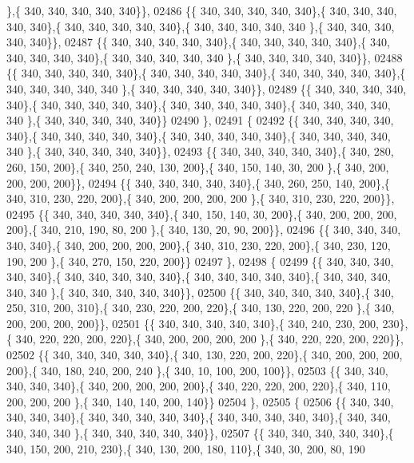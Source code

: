 \begin{DoxyCode}
      \},\{ 340, 340, 340, 340, 340\}\},
02486 \{\{ 340, 340, 340, 340, 340\},\{ 340, 340, 340, 340, 340\},\{ 340, 340, 340, 340, 340\},\{ 340, 340, 340, 340, 340
      \},\{ 340, 340, 340, 340, 340\}\},
02487 \{\{ 340, 340, 340, 340, 340\},\{ 340, 340, 340, 340, 340\},\{ 340, 340, 340, 340, 340\},\{ 340, 340, 340, 340, 340
      \},\{ 340, 340, 340, 340, 340\}\},
02488 \{\{ 340, 340, 340, 340, 340\},\{ 340, 340, 340, 340, 340\},\{ 340, 340, 340, 340, 340\},\{ 340, 340, 340, 340, 340
      \},\{ 340, 340, 340, 340, 340\}\},
02489 \{\{ 340, 340, 340, 340, 340\},\{ 340, 340, 340, 340, 340\},\{ 340, 340, 340, 340, 340\},\{ 340, 340, 340, 340, 340
      \},\{ 340, 340, 340, 340, 340\}\}
02490 \},
02491 \{
02492 \{\{ 340, 340, 340, 340, 340\},\{ 340, 340, 340, 340, 340\},\{ 340, 340, 340, 340, 340\},\{ 340, 340, 340, 340, 340
      \},\{ 340, 340, 340, 340, 340\}\},
02493 \{\{ 340, 340, 340, 340, 340\},\{ 340, 280, 260, 150, 200\},\{ 340, 250, 240, 130, 200\},\{ 340, 150, 140,  30, 200
      \},\{ 340, 200, 200, 200, 200\}\},
02494 \{\{ 340, 340, 340, 340, 340\},\{ 340, 260, 250, 140, 200\},\{ 340, 310, 230, 220, 200\},\{ 340, 200, 200, 200, 200
      \},\{ 340, 310, 230, 220, 200\}\},
02495 \{\{ 340, 340, 340, 340, 340\},\{ 340, 150, 140,  30, 200\},\{ 340, 200, 200, 200, 200\},\{ 340, 210, 190,  80, 200
      \},\{ 340, 130,  20,  90, 200\}\},
02496 \{\{ 340, 340, 340, 340, 340\},\{ 340, 200, 200, 200, 200\},\{ 340, 310, 230, 220, 200\},\{ 340, 230, 120, 190, 200
      \},\{ 340, 270, 150, 220, 200\}\}
02497 \},
02498 \{
02499 \{\{ 340, 340, 340, 340, 340\},\{ 340, 340, 340, 340, 340\},\{ 340, 340, 340, 340, 340\},\{ 340, 340, 340, 340, 340
      \},\{ 340, 340, 340, 340, 340\}\},
02500 \{\{ 340, 340, 340, 340, 340\},\{ 340, 250, 310, 200, 310\},\{ 340, 230, 220, 200, 220\},\{ 340, 130, 220, 200, 220
      \},\{ 340, 200, 200, 200, 200\}\},
02501 \{\{ 340, 340, 340, 340, 340\},\{ 340, 240, 230, 200, 230\},\{ 340, 220, 220, 200, 220\},\{ 340, 200, 200, 200, 200
      \},\{ 340, 220, 220, 200, 220\}\},
02502 \{\{ 340, 340, 340, 340, 340\},\{ 340, 130, 220, 200, 220\},\{ 340, 200, 200, 200, 200\},\{ 340, 180, 240, 200, 240
      \},\{ 340,  10, 100, 200, 100\}\},
02503 \{\{ 340, 340, 340, 340, 340\},\{ 340, 200, 200, 200, 200\},\{ 340, 220, 220, 200, 220\},\{ 340, 110, 200, 200, 200
      \},\{ 340, 140, 140, 200, 140\}\}
02504 \},
02505 \{
02506 \{\{ 340, 340, 340, 340, 340\},\{ 340, 340, 340, 340, 340\},\{ 340, 340, 340, 340, 340\},\{ 340, 340, 340, 340, 340
      \},\{ 340, 340, 340, 340, 340\}\},
02507 \{\{ 340, 340, 340, 340, 340\},\{ 340, 150, 200, 210, 230\},\{ 340, 130, 200, 180, 110\},\{ 340,  30, 200,  80, 190

\end{DoxyCode}
